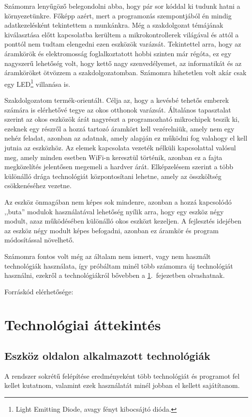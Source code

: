 \documentclass{thesis-ekf}
\theoremstyle{definition}
\theoremstyle{remark}
\begin{document}
	Számomra lenyűgöző belegondolni abba, hogy pár sor kóddal ki tudunk hatni a környezetünkre. Főképp azért, mert a programozás szempontjából én mindig adatkezelésként tekintettem a munkánkra. Még a szakdolgozat témájának kiválasztása előtt kapcsolatba kerültem a mikrokontrollerek világával és attól a ponttól nem tudtam elengedni ezen eszközök varázsát. Tekintettel arra, hogy az áramkörök és elektromosság foglalkoztatott hobbi szinten már régóta, ez egy nagyszerű lehetőség volt, hogy kettő nagy szenvedélyemet, az informatikát és az áramköröket ötvözzem a szakdolgozatomban. Számomra hihetetlen volt akár csak egy LED\footnote{Light Emitting Diode, avagy fényt kibocsájtó dióda.} villanása is.
	
	Szakdolgozatom termék-orientált. Célja az, hogy a kevésbé tehetős emberek számára is elérhetővé tegye az okos otthonok varázsát. Általános tapasztalat szerint az okos eszközök árát nagyrészt a programozható mikrochipek teszik ki, ezeknek egy részről a hozzá tartozó áramkört kell vezérelniük, amely nem egy nehéz feladat, azonban az adatnak, amely alapján ez működni fog valahogy el kell jutnia az eszközhöz. Az elemek kapcsolata vezeték nélküli kapcsolattal valósul meg, amely minden esetben WiFi-n keresztül történik, azonban ez a fajta megközelítés jelentősen megemeli a hardver árát. Elképzelésem szerint a több különálló drága technológiát központosítani lehetne, amely az összköltség csökkenéséhez vezetne.
	
	Az eszköz önmagában nem képes sok mindenre, azonban a hozzá kapcsolódó ,,buta'' modulok használatával lehetőség nyílik arra, hogy egy eszköz négy modult, azaz működésében különálló okos eszközt kezeljen.
	A fejlesztés idejében az eszköz négy modult képes befogadni, azonban ez áramkör és program módosítással növelhető.
	
	Számomra fontos volt még az általam nem ismert, vagy nem használt technológiák használata, így próbáltam minél több számomra új technológiát használni, ezekről a technológiákról bővebben a \ref{ch_tech}.~fejezetben olvashatnak.
	\begin{center}
		Forráskód elérhetősége:\\
		{}
	\end{center}
	\chapter{Technológiai áttekintés}
	\label{ch_tech}
	\section{Eszköz oldalon alkalmazott technológiák}
	A rendszer sokrétű felépítése eredményeként több technológiát és programot fel kellet kutatnom, valamint ezek használatát minél jobban el kellett sajátítanom.
\end{document}
